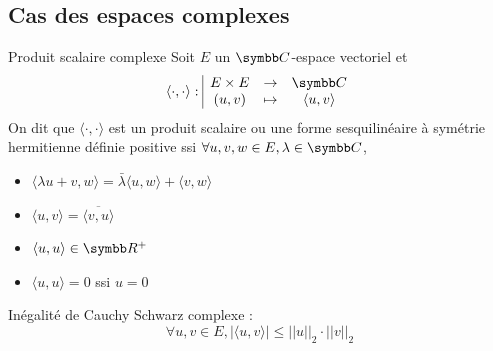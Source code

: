 \subsection{Cas des espaces complexes}

\begin{definition}{Produit scalaire complexe}{}
    Soit $E$ un $\C$-espace vectoriel et 
    \[\fonction{\langle\cdot, \cdot\rangle}{E \times E}{\C}{(u, v)}{\langle u, v \rangle}\]
    On dit que $\langle\cdot, \cdot\rangle$ est un produit scalaire ou une forme 
    sesquilinéaire à symétrie hermitienne définie positive ssi
    $\forall u, v, w \in E, \lambda \in \C$, 

    \begin{itemize}
        \item $\langle\lambda u + v, w \rangle = \bar \lambda\langle u, w \rangle + \langle v, w \rangle$
        \item $\langle u, v \rangle = \overline{\langle v, u \rangle}$
        \item $\langle u, u \rangle \in \R^+$
        \item $\langle u, u \rangle = 0$ ssi $u=0$
    \end{itemize}
\end{definition}

\begin{theoreme}{}{}
    Inégalité de Cauchy Schwarz complexe :
    \[\forall u, v \in E, |\langle u, v \rangle| \leqslant ||u||_2 \cdot ||v||_2\]
\end{theoreme}


